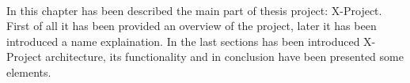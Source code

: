 \paragraph{}
In this chapter has been described the main part of thesis project: X-Project.
First of all it has been provided an overview of the project, later it has been introduced a name explaination. In the last sections has been introduced X-Project architecture, its functionality and in conclusion have been presented some elements.